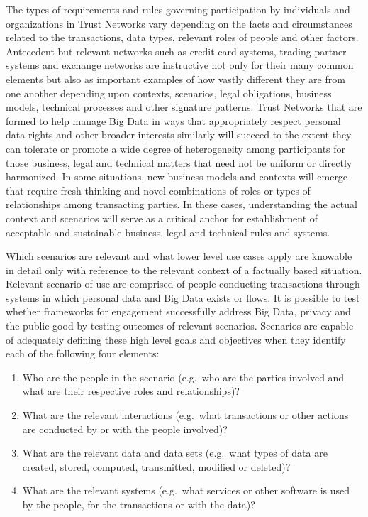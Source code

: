 The types of requirements and rules governing participation by individuals and organizations in Trust Networks vary depending on the facts and circumstances related to the transactions, data types, relevant roles of people and other factors. 
Antecedent but relevant networks such as credit card systems, trading partner systems and exchange networks are instructive not only for their many common elements but also as important examples of how vastly different they are from one another depending upon contexts, scenarios, legal obligations, business models, technical processes and other signature patterns.
Trust Networks that are formed to help manage Big Data in ways that appropriately respect personal data rights and other broader interests similarly will succeed to the extent they can tolerate or promote a wide degree of heterogeneity among participants for those business, legal and technical matters that need not be uniform or directly harmonized.
In some situations, new business models and contexts will emerge that require fresh thinking and novel combinations of roles or types of relationships among transacting parties.
In these cases, understanding the actual context and scenarios will serve as a critical anchor for establishment of acceptable and sustainable business, legal and technical rules and systems.  

Which scenarios are relevant and what lower level use cases apply are knowable in detail only with reference to the relevant context of a factually based situation.
Relevant scenario of use are comprised of people conducting transactions through systems in which personal data and Big Data exists or flows.
It is possible to test whether frameworks for engagement successfully address Big Data, privacy and the public good by testing outcomes of relevant scenarios. 
Scenarios are capable of adequately defining these high level goals and objectives when they identify each of the following four elements:  

\begin{enumerate}
\item Who are the people in the scenario (e.g.~who are the parties involved and what are their respective roles and relationships)? 
\item What are the relevant interactions (e.g.~what transactions or other actions are conducted by or with the people involved)?
\item What are the relevant data and data sets (e.g.~what types of data are created, stored, computed, transmitted, modified or deleted)?
\item What are the relevant systems (e.g.~what services or other software is used by the people, for the transactions or with the data)? 
\end{enumerate}

